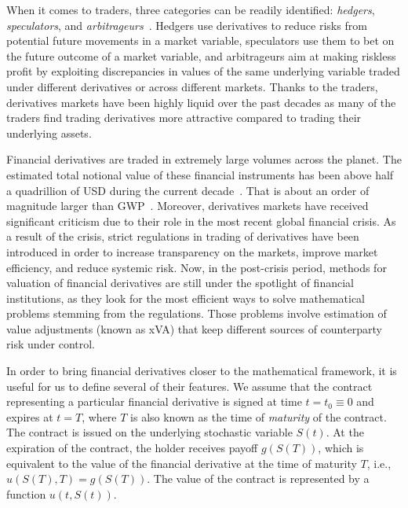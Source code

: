 \documentclass{UUThesisTemplate}
\begin{document}
\par
When it comes to traders, three categories can be readily identified: \emph{hedgers}, \emph{speculators}, and \emph{arbitrageurs}~\cite{hull2017options}. Hedgers use derivatives to reduce risks from potential future movements in a market variable, speculators use them to bet on the future outcome of a market variable, and arbitrageurs aim at making riskless profit by exploiting discrepancies in values of the same underlying variable traded under different derivatives or across different markets. Thanks to the traders, derivatives markets have been highly liquid over the past decades as many of the traders find trading derivatives more attractive compared to trading their underlying assets.

\par
Financial derivatives are traded in extremely large volumes across the planet. %
The estimated total notional value of these financial instruments has been above half a quadrillion of USD during the current decade~\cite{bank2018annual}. That is about an order of magnitude larger than GWP~\cite{worldgdp2018annual}. Moreover, derivatives markets have received significant criticism due to their role in the most recent global financial crisis.  As a result of the crisis, strict regulations in trading of derivatives have been introduced in order to increase transparency on the markets, improve market efficiency, and reduce systemic risk. Now, in the post-crisis period, methods for valuation of financial derivatives are still under the spotlight of financial institutions, as they look for the most efficient ways to solve mathematical problems stemming from the regulations. Those problems involve estimation of value adjustments (known as xVA) that keep different sources of counterparty risk under control. 

\par
In order to bring financial derivatives closer to the mathematical framework, it is useful for us to define several of their features. We assume that the contract representing a particular financial derivative is signed at time $t=t_0\equiv0$ and expires at $t=T$, where $T$ is also known as the time of \emph{maturity} of the contract. The contract is issued on the underlying stochastic variable $S(t)$. At the expiration of the contract, the holder receives payoff $g(S(T))$, which is equivalent to the value of the financial derivative at the time of maturity $T$, i.e., $u(S(T),T) = g(S(T))$. The value of the contract is represented by a function $u(t,S(t))$.
\end{document}
